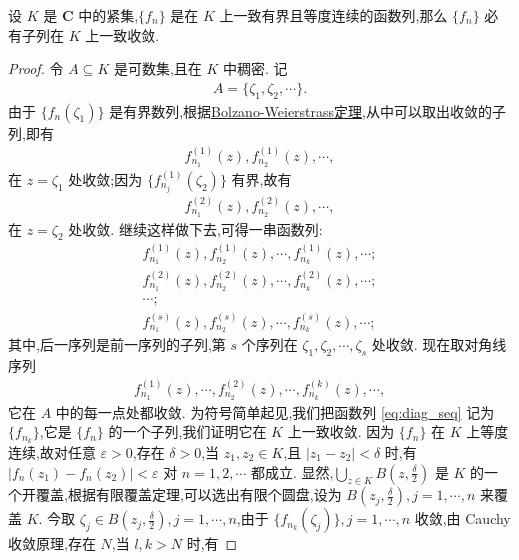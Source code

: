 \documentclass[../../main.tex]{subfiles}%
\begin{document}
\begin{theorem}\label{thm:arzela_ascoli}
设 \(K\) 是 \(\bm{C}\) 中的紧集,\(\{f_n\}\) 是在 \(K\) 上一致有界且等度连续的函数列,那么 \(\{f_n\}\) 必有子列在 \(K\) 上一致收敛.
\end{theorem}
\begin{proof}
令 \(A \subseteq K\) 是可数集,且在 \(K\) 中稠密. 记
\begin{align*}
A = \{\zeta_1, \zeta_2, \cdots\}.
\end{align*}
由于 \(\{f_n(\zeta_1)\}\) 是有界数列,根据\hyperref[theorem:Bolzano-Weierstrass定理]{Bolzano-Weierstrass定理},从中可以取出收敛的子列,即有
\begin{align*}
f_{n_1}^{(1)}(z), f_{n_2}^{(1)}(z), \cdots,
\end{align*}
在 \(z = \zeta_1\) 处收敛;因为 \(\{f_{n_j}^{(1)}(\zeta_2)\}\) 有界,故有
\begin{align*}
f_{n_1}^{(2)}(z), f_{n_2}^{(2)}(z), \cdots,
\end{align*}
在 \(z = \zeta_2\) 处收敛. 继续这样做下去,可得一串函数列:
\begin{align*}
f_{n_1}^{(1)}(z), f_{n_2}^{(1)}(z), \cdots, f_{n_k}^{(1)}(z), \cdots; \\
f_{n_1}^{(2)}(z), f_{n_2}^{(2)}(z), \cdots, f_{n_k}^{(2)}(z), \cdots; \\
\cdots; \\
f_{n_1}^{(s)}(z), f_{n_2}^{(s)}(z), \cdots, f_{n_k}^{(s)}(z), \cdots;
\end{align*}
其中,后一序列是前一序列的子列,第 \(s\) 个序列在 \(\zeta_1, \zeta_2, \cdots, \zeta_s\) 处收敛. 现在取对角线序列
\begin{align}
f_{n_1}^{(1)}(z), \cdots, f_{n_2}^{(2)}(z), \cdots, f_{n_k}^{(k)}(z), \cdots, \label{eq:diag_seq}
\end{align}
它在 \(A\) 中的每一点处都收敛. 为符号简单起见,我们把函数列 \eqref{eq:diag_seq} 记为 \(\{f_{n_k}\}\),它是 \(\{f_n\}\) 的一个子列,我们证明它在 \(K\) 上一致收敛. 因为 \(\{f_n\}\) 在 \(K\) 上等度连续,故对任意 \(\varepsilon > 0\),存在 \(\delta > 0\),当 \(z_1, z_2 \in K\),且 \(|z_1 - z_2| < \delta\) 时,有 \(|f_n(z_1) - f_n(z_2)| < \varepsilon\) 对 \(n=1, 2, \cdots\) 都成立. 显然,\(\bigcup\limits_{z \in K} B\left(z, \frac{\delta}{2}\right)\) 是 \(K\) 的一个开覆盖,根据有限覆盖定理,可以选出有限个圆盘,设为 \(B\left(z_j, \frac{\delta}{2}\right), j=1, \cdots, n\) 来覆盖 \(K\). 今取 \(\zeta_j \in B\left(z_j, \frac{\delta}{2}\right), j=1, \cdots, n\),由于 \(\{f_{n_k}(\zeta_j)\}, j=1, \cdots, n\) 收敛,由 Cauchy 收敛原理,存在 \(N\),当 \(l, k > N\) 时,有

\end{proof}
\end{document}
